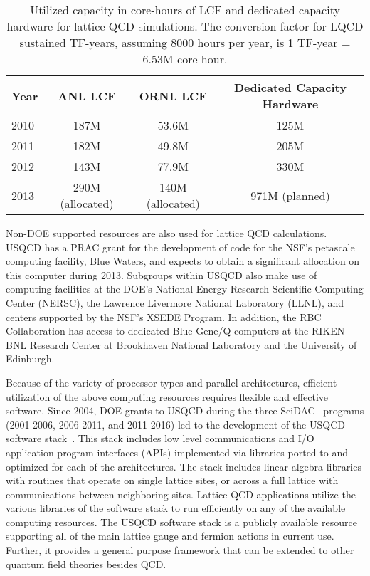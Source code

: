 \begin{table}[t]
\begin{center}
\begin{tabular}{l|ccc}  
Year & ANL LCF & ORNL LCF & Dedicated Capacity Hardware \\  \hline
2010 & 187M & 53.6M & 125M \\
2011 & 182M & 49.8M & 205M \\
2012 & 143M & 77.9M & 330M \\
2013 & 290M (allocated) & 140M (allocated) & 971M (planned) \\ \hline
\end{tabular}
\caption{Utilized capacity in core-hours of LCF and dedicated capacity 
hardware for lattice QCD simulations.  The conversion factor for LQCD sustained
TF-years, assuming 8000 hours per year, is 1 TF-year = 6.53M core-hour.}
\label{tab:current}
\end{center}
\end{table}

Non-DOE supported resources are also used for lattice QCD calculations.  USQCD
has a PRAC grant for the development of code for the NSF's petascale computing
facility, Blue Waters, and expects to obtain a significant allocation on this
computer during 2013.  Subgroups within USQCD also make use of computing
facilities at the DOE's National Energy Research Scientific Computing Center
(NERSC), the Lawrence Livermore National Laboratory (LLNL), and centers
supported by the NSF's XSEDE Program.  In addition, the RBC Collaboration has
access to dedicated Blue Gene/Q computers at the RIKEN BNL Research Center at
Brookhaven National Laboratory and the University of Edinburgh.

Because of the variety of processor types and parallel architectures,
efficient utilization of the above computing resources requires flexible and
effective software.  Since 2004, DOE grants to USQCD during the three
SciDAC~\cite{SciDAC} programs (2001-2006, 2006-2011, and 2011-2016) led to the
development of the USQCD software stack~\cite{SciDAC-software}.  This stack
includes low level communications and I/O application program interfaces
(APIs) implemented via libraries ported to and optimized for each of the
architectures.  The stack includes linear algebra libraries with routines that
operate on single lattice sites, or across a full lattice with communications
between neighboring sites.  Lattice QCD applications 
utilize the various libraries of the software stack to run efficiently on any
of the available computing resources.  The USQCD software stack is a publicly
available resource supporting all of the main lattice gauge and fermion
actions in current use.  Further, it provides a general purpose framework that
can be extended to other quantum field theories besides QCD.

